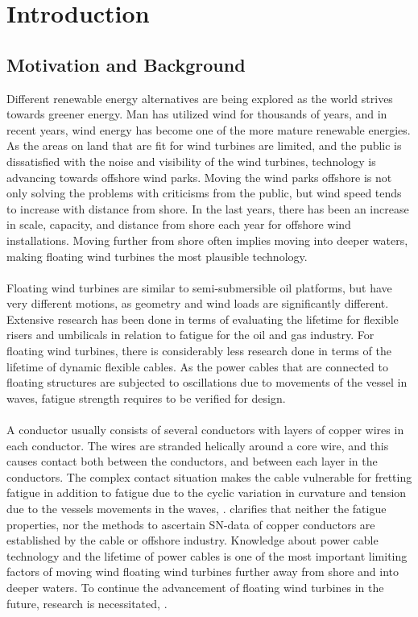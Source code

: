 \chapter{Introduction}
\label{chap:introduction}
\section{Motivation and Background}
Different renewable energy alternatives are being explored as the world strives towards greener energy.  Man has utilized wind for thousands of years, and in recent years, wind energy has become one of the more mature renewable energies. As the areas on land that are fit for wind turbines are limited, and the public is dissatisfied with the noise and visibility of the wind turbines, technology is advancing towards offshore wind parks. Moving the wind parks offshore is not only solving the problems with criticisms from the public, but wind speed tends to increase with distance from shore. In the last years, there has been an increase in scale, capacity, and distance from shore each year for offshore wind installations. Moving further from shore often implies moving into deeper waters, making floating wind turbines the most plausible technology.\\\\ Floating wind turbines are similar to semi-submersible oil platforms, but have very different motions, as geometry and wind loads are significantly different. Extensive research has been done in terms of evaluating the lifetime for flexible risers and umbilicals in relation to fatigue for the oil and gas industry. For floating wind turbines, there is considerably less research done in terms of the lifetime of dynamic flexible cables. As the power cables that are connected to floating structures are subjected to oscillations due to movements of the vessel in waves, fatigue strength requires to be verified for design.\\\\
A conductor usually consists of several conductors with layers of copper wires in each conductor. The wires are stranded helically around a core wire, and this causes contact both between the conductors, and between each layer in the conductors. The complex contact situation makes the cable vulnerable for fretting fatigue in addition to fatigue due to the cyclic variation in curvature and tension due to the vessels movements in the waves,  \cite{s300}. \cite{Karlsen2010} clarifies that neither the fatigue properties, nor the methods to ascertain SN-data of copper conductors are established by the cable or offshore industry.  Knowledge about power cable technology and the lifetime of power cables is one of the most important limiting factors of moving wind floating wind turbines further away from shore and into deeper waters. To continue the advancement of floating wind turbines in the future, research is necessitated, \cite{Thies2012}.
